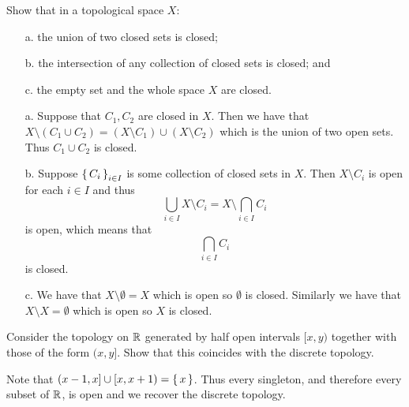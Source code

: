 \documentclass[letterpaper, 11pt, oneside]{book}
\begin{document}
\begin{exercise}
  Show that in a topological space $X$:
  \begin{enumerate}
  \item[a.] the union of two closed sets is closed;
  \item[b.] the intersection of any collection of closed sets is closed; and
  \item[c.] the empty set and the whole space $X$ are closed.
  \end{enumerate}
\end{exercise}
\begin{pf}
  \begin{enumerate}
  \item[a.] Suppose that $C_{1}, C_{2}$ are closed in $X$.
        Then we have that $X \setminus (C_{1} \cup C_{2}) = (X \setminus C_{1}) \cup (X \setminus C_{2})$ which is the union of two open sets.
        Thus $C_{1} \cup C_{2}$ is closed.
  \item[b.] Suppose $\set{C_{i}}_{i \in I}$ is some collection of closed sets in $X$.
        Then $X \setminus C_{i}$ is open for each $i \in I$ and thus
        \[
          \bigcup_{i \in I} X \setminus C_{i} =  X \setminus \bigcap_{i \in I} C_{i}
        \]
        is open, which means that
        \[
          \bigcap_{i \in I} C_{i}
        \]
        is closed.
  \item[c.] We have that $X \setminus \emptyset = X$ which is open so $\emptyset$ is closed.
        Similarly we have that $X \setminus X = \emptyset$ which is open so $X$ is closed.
  \end{enumerate}
\end{pf}

\begin{exercise}
  Consider the topology on $\mathbb{R}$ generated by half open intervals $[x, y)$ together with those of the form $(x, y]$.
  Show that this coincides with the discrete topology.
\end{exercise}
\begin{pf}
  Note that $(x - 1, x] \cup [x, x + 1) = \set{x}$.
  Thus every singleton, and therefore every subset of $\mathbb{R}$, is open and we recover the discrete topology.
\end{pf}

\clearpage
\end{document}
